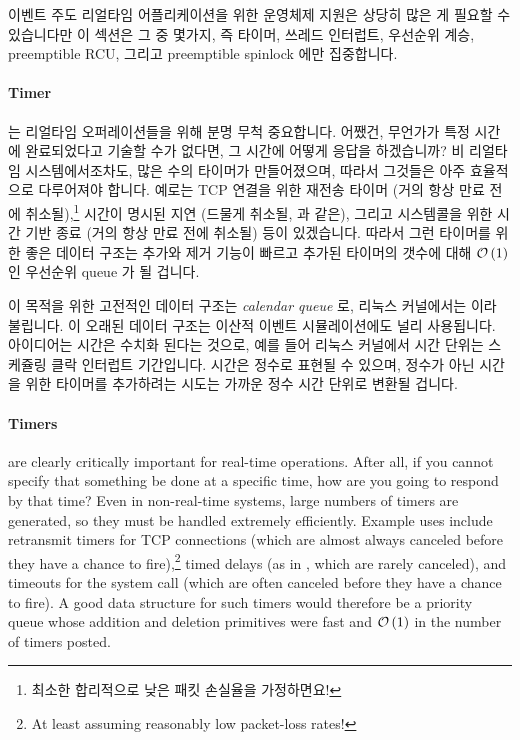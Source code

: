 이벤트 주도 리얼타임 어플리케이션을 위한 운영체제 지원은 상당히 많은 게 필요할
수 있습니다만 이 섹션은 그 중 몇가지, 즉 타이머, 쓰레드 인터럽트, 우선순위
계승, preemptible RCU, 그리고 preemptible spinlock 에만 집중합니다.

\paragraph{Timer} 는 리얼타임 오퍼레이션들을 위해 분명 무척 중요합니다.
어쨌건, 무언가가 특정 시간에 완료되었다고 기술할 수가 없다면, 그 시간에 어떻게
응답을 하겠습니까?
비 리얼타임 시스템에서조차도, 많은 수의 타이머가 만들어졌으며, 따라서 그것들은
아주 효율적으로 다루어져야 합니다.
예로는 TCP 연결을 위한 재전송 타이머 (거의 항상 만료 전에 취소될),\footnote{
	최소한 합리적으로 낮은 패킷 손실율을 가정하면요!}
시간이 명시된 지연 (드물게 취소될,  과 같은), 그리고 
시스템콜을 위한 시간 기반 종료 (거의 항상 만료 전에 취소될) 등이 있겠습니다.
따라서 그런 타이머를 위한 좋은 데이터 구조는 추가와 제거 기능이 빠르고 추가된
타이머의 갯수에 대해 $\mathcal{O}\left(1\right)$ 인 우선순위 queue 가 될 겁니다.

이 목적을 위한 고전적인 데이터 구조는 \emph{calendar queue} 로, 리눅스
커널에서는  이라 불립니다.
이 오래된 데이터 구조는 이산적 이벤트 시뮬레이션에도 널리 사용됩니다.
아이디어는 시간은 수치화 된다는 것으로, 예를 들어 리눅스 커널에서 시간 단위는
스케쥴링 클락 인터럽트 기간입니다.
시간은 정수로 표현될 수 있으며, 정수가 아닌 시간을 위한 타이머를 추가하려는
시도는 가까운 정수 시간 단위로 변환될 겁니다.

\iffalse

\paragraph{Timers} are clearly critically important for real-time
operations.
After all, if you cannot specify that something be done at a specific
time, how are you going to respond by that time?
Even in non-real-time systems, large numbers of timers are generated,
so they must be handled extremely efficiently.
Example uses include retransmit timers for TCP connections (which are
almost always canceled before they have a chance to fire),\footnote{
	At least assuming reasonably low packet-loss rates!}
timed delays (as in , which are rarely canceled),
and timeouts for the  system call (which are often
canceled before they have a chance to fire).
A good data structure for such timers would therefore be a priority queue
whose addition and deletion primitives were fast and $\mathcal{O}\left(1\right)$ in the number
of timers posted.

